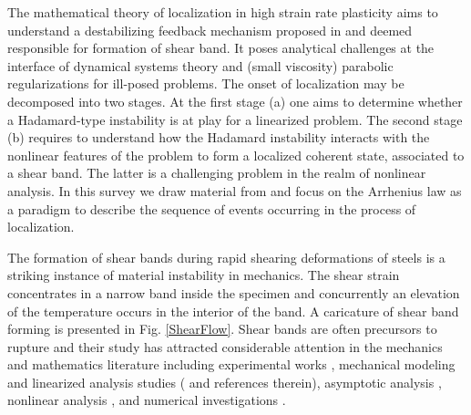 \documentclass[a4paper,11pt]{article}
\theoremstyle{remark}
\begin{document}
The mathematical theory of localization in high strain rate plasticity aims to understand
a destabilizing feedback mechanism proposed in  \cite{ZH,CDHS} and
deemed responsible for formation of shear band.
It poses analytical challenges at the interface of dynamical systems theory
and (small viscosity) parabolic regularizations for ill-posed problems.
The onset of localization may be decomposed into two stages.
At the first stage (a) one aims to determine whether a Hadamard-type instability is
at play for a linearized problem. The second stage (b)  requires  to understand how the Hadamard instability
interacts with the nonlinear features of the problem to form a localized coherent state,
associated to a shear band.
The latter is a challenging problem in the realm of nonlinear analysis.
In this survey we draw material from \cite{KT,KT2,BKT} and focus on the Arrhenius law as a
paradigm to describe the sequence of events occurring in the process of localization.



The formation of shear bands during rapid
shearing deformations of steels \cite{CCHD,HDH,ZH}  is a striking instance of material instability in mechanics.
The shear strain concentrates in a narrow band inside the specimen and
concurrently an elevation of the temperature occurs in the interior of the band.
A caricature of shear band forming is presented in Fig. \ref{ShearFlow}.
Shear bands are often precursors to rupture and their study has attracted considerable
attention in the mechanics and mathematics literature including
experimental works  \cite{CCHD,HDH}, mechanical modeling
and  linearized analysis studies  (\cite{CDHS,FM,MC,WW,Wr} and references therein),
asymptotic analysis \cite{DO, WrOc},
nonlinear analysis  \cite{DH,Tzavaras87,Tzavaras91,BPV},
and numerical  investigations \cite{Wa,ELW,BKT}.
\end{document}
